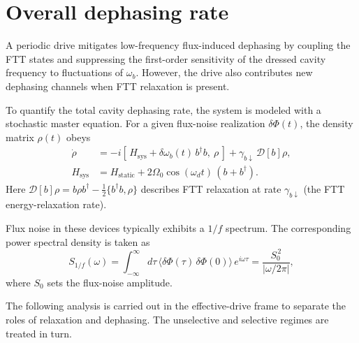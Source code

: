 \section{Overall dephasing rate}
\label{sec3}

A periodic drive mitigates low-frequency flux-induced dephasing by coupling the FTT states and suppressing the first-order sensitivity of the dressed cavity frequency to fluctuations of $\omega_b$. However, the drive also contributes new dephasing channels when FTT relaxation is present.

To quantify the total cavity dephasing rate, the system is modeled with a stochastic master equation. For a given flux-noise realization $\delta\Phi(t)$, the density matrix $\rho(t)$ obeys
\begin{align}
\dot{\rho}
&= -i\left[\,H_{\mathrm{sys}} + \delta\omega_b(t)\, b^\dagger b,\ \rho\,\right]
+ \gamma_{b\downarrow}\,\mathcal{D}[b]\rho,
\nonumber \\
H_{\mathrm{sys}}
&= H_{\mathrm{static}} + 2\Omega_0 \cos(\omega_d t)\,(b + b^\dagger).
\label{Linblad}\end{align}
Here $\mathcal{D}[b]\rho = b\rho b^\dagger - \tfrac{1}{2}\{b^\dagger b, \rho\}$ describes FTT relaxation at rate $\gamma_{b\downarrow}$ (the FTT energy-relaxation rate).

Flux noise in these devices typically exhibits a $1/f$ spectrum. The corresponding power spectral density is taken as
\begin{equation}
S_{1/f}(\omega)
= \int_{-\infty}^{\infty} d\tau\, \langle \delta\Phi(\tau)\,\delta\Phi(0)\rangle\, e^{i\omega \tau}
= \frac{S_0^{\,2}}{\left|\omega/2\pi\right|},
\end{equation}
where $S_0$ sets the flux-noise amplitude.

The following analysis is carried out in the effective-drive frame to separate the roles of relaxation and dephasing. The unselective and selective regimes are treated in turn.

